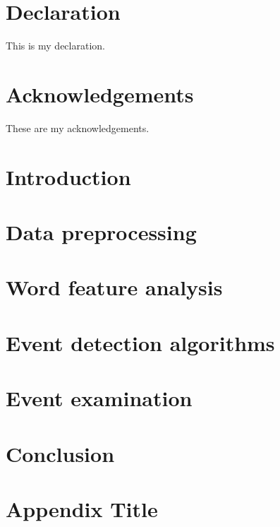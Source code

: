 \documentclass[12pt,twoside]{report}
\begin{document}






\chapter*{Declaration}
This is my declaration.


\chapter*{Acknowledgements}
These are my acknowledgements.


\tableofcontents
\listoffigures
\listofalgorithms


\chapter{Introduction}


\chapter{Data preprocessing}


\chapter{Word feature analysis}


\chapter{Event detection algorithms}


\chapter{Event examination}


\chapter{Conclusion}



\appendix
\chapter{Appendix Title}



\printbibliography
\end{document}

